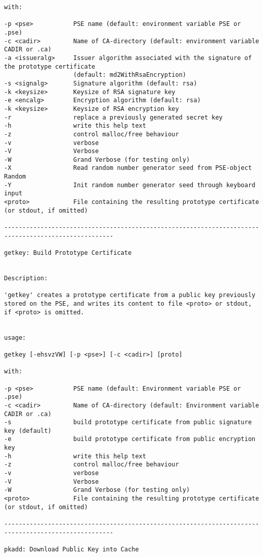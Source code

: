 {\begin{verbatim}
with:

-p <pse>           PSE name (default: environment variable PSE or .pse)
-c <cadir>         Name of CA-directory (default: environment variable CADIR or .ca)
-a <issueralg>     Issuer algorithm associated with the signature of the prototype certificate
                   (default: md2WithRsaEncryption)
-s <signalg>       Signature algorithm (default: rsa)
-k <keysize>       Keysize of RSA signature key
-e <encalg>        Encryption algorithm (default: rsa)
-k <keysize>       Keysize of RSA encryption key
-r                 replace a previously generated secret key
-h                 write this help text
-z                 control malloc/free behaviour
-v                 verbose
-V                 Verbose
-W                 Grand Verbose (for testing only)
-X                 Read random number generator seed from PSE-object Random
-Y                 Init random number generator seed through keyboard input
<proto>            File containing the resulting prototype certificate (or stdout, if omitted)

----------------------------------------------------------------------------------------------------

getkey: Build Prototype Certificate


Description:

'getkey' creates a prototype certificate from a public key previously
stored on the PSE, and writes its content to file <proto> or stdout,
if <proto> is omitted.


usage:

getkey [-ehsvzVW] [-p <pse>] [-c <cadir>] [proto]

with:

-p <pse>           PSE name (default: Environment variable PSE or .pse)
-c <cadir>         Name of CA-directory (default: Environment variable CADIR or .ca)
-s                 build prototype certificate from public signature key (default)
-e                 build prototype certificate from public encryption key
-h                 write this help text
-z                 control malloc/free behaviour
-v                 verbose
-V                 Verbose
-W                 Grand Verbose (for testing only)
<proto>            File containing the resulting prototype certificate (or stdout, if omitted)

----------------------------------------------------------------------------------------------------

pkadd: Download Public Key into Cache



\end{verbatim}}
